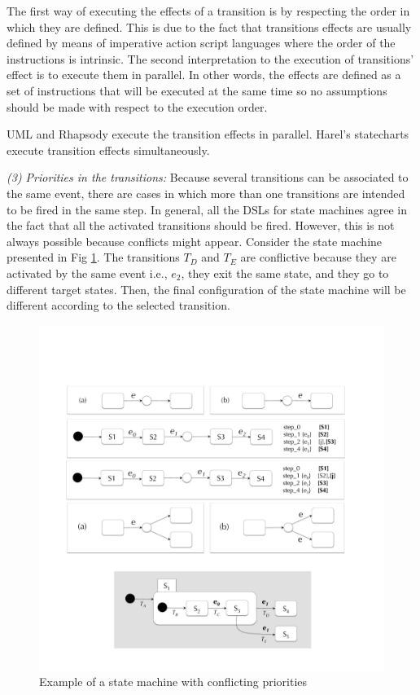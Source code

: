 The first way of executing the effects of a transition is by respecting the order in which they are defined. This is due to the fact that transitions effects are usually defined by means of imperative action script languages where the order of the instructions is intrinsic. The second interpretation to the execution of transitions' effect is to execute them in parallel. In other words, the effects are defined as a set of instructions that will be executed at the same time so no assumptions should be made with respect to the execution order. 

UML and Rhapsody execute the transition effects in parallel. Harel's statecharts execute transition effects simultaneously.

\vspace{2mm}
\textit{(3) Priorities in the transitions:} Because several transitions can be associated to the same event, there are cases in which more than one transitions are intended to be fired in the same step. In general, all the DSLs for state machines agree in the fact that all the activated transitions should be fired. However, this is not always possible because conflicts might appear. Consider the state machine presented in Fig \ref{fig:conflicting-priorities}. The transitions $T_D$ and $T_E$ are conflictive because they are activated by the same event i.e., $e_2$, they exit the same state, and they go to different target states. Then, the final configuration of the state machine will be different according to the selected transition. 

\begin{figure}[h!]
  \centering
  \includegraphics[width=1\linewidth]{images/conflicting-priorities.pdf}
  \caption{Example of a state machine with conflicting priorities}
  \label{fig:conflicting-priorities}
\end{figure}

